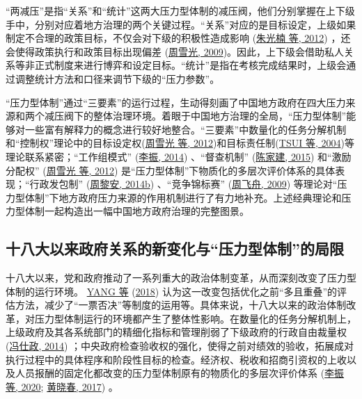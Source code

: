 \documentclass[
  12pt,
]{ctexart}
\begin{document}
``两减压''是指``关系''和``统计''这两大压力型体制的减压阀，他们分别掌握在上下级手中，分别对应着地方治理的两个关键过程。``关系''对应的是目标设定，上级如果制定不合理的政策目标，不仅会对下级的积极性造成影响 (\protect\hyperlink{ref-ZhuGuangNanEtAl2012}{朱光楠 等, 2012}) ，还会使得政策执行和政策目标出现偏差 (\protect\hyperlink{ref-ZhouXueGuang2009}{周雪光, 2009})。因此，上下级会借助私人关系等非正式制度来进行博弈和设定目标。``统计''是指在考核完成结果时，上级会通过调整统计方法和口径来调节下级的``压力参数''。

``压力型体制''通过``三要素''的运行过程，生动得刻画了中国地方政府在四大压力来源和两个减压阀下的整体治理环境。着眼于中国地方治理的全局，``压力型体制''能够对一些富有解释力的概念进行较好地整合。``三要素''中数量化的任务分解机制和``控制权''理论中的目标设定权(\protect\hyperlink{ref-ZhouXueGuangLianHong2012}{周雪光 等, 2012})和目标责任制(\protect\hyperlink{ref-TsuiWang2004}{TSUI 等, 2004})等理论联系紧密；``工作组模式'' (\protect\hyperlink{ref-LiZhen2014}{李振, 2014}) 、``督查机制'' (\protect\hyperlink{ref-ChenJiaJian2015}{陈家建, 2015}) 和``激励分配权'' (\protect\hyperlink{ref-ZhouXueGuangLianHong2012}{周雪光 等, 2012}) 是``压力型体制''下物质化的多层次评价体系的具体表现；``行政发包制'' (\protect\hyperlink{ref-ZhouLiAn2014a}{周黎安, 2014b}) 、``竞争锦标赛'' (\protect\hyperlink{ref-ZhouFeiZhou2009}{周飞舟, 2009}) 等理论对``压力型体制''下地方政府压力来源的作用机制进行了有力地补充。上述经典理论和压力型体制一起构造出一幅中国地方政府治理的完整图景。

\hypertarget{ux5341ux516bux5927ux4ee5ux6765ux653fux5e9cux5173ux7cfbux7684ux65b0ux53d8ux5316ux4e0eux538bux529bux578bux4f53ux5236ux7684ux5c40ux9650}{%
\subsection{十八大以来政府关系的新变化与``压力型体制''的局限}\label{ux5341ux516bux5927ux4ee5ux6765ux653fux5e9cux5173ux7cfbux7684ux65b0ux53d8ux5316ux4e0eux538bux529bux578bux4f53ux5236ux7684ux5c40ux9650}}

十八大以来，党和政府推动了一系列重大的政治体制变革，从而深刻改变了压力型体制的运行环境。 \protect\hyperlink{ref-YangYan2018}{YANG 等} (\protect\hyperlink{ref-YangYan2018}{2018}) 认为这一改变包括优化之前``多且重叠''的评估方法，减少了``一票否决''等制度的运用等。具体来说，十八大以来的政治体制改革，对压力型体制运行的环境都产生了整体性影响。在数量化的任务分解机制上，上级政府及其各系统部门的精细化指标和管理削弱了下级政府的行政自由裁量权 (\protect\hyperlink{ref-FengShiZheng2014}{冯仕政, 2014}) ；中央政府检查验收权的强化，使得之前对绩效的验收，拓展成对执行过程中的具体程序和阶段性目标的检查。经济权、税收和招商引资权的上收以及人员报酬的固定化都改变的压力型体制原有的物质化的多层次评价体系 (\protect\hyperlink{ref-LiZhenEtAl2020c}{李振 等, 2020}; \protect\hyperlink{ref-HuangXiaoChun2017}{黄晓春, 2017}) 。
\end{document}
